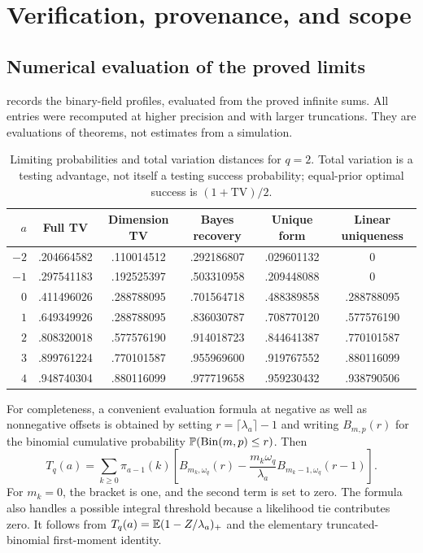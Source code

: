 \section{Verification, provenance, and scope}
\label{sec:provenance}

\subsection{Numerical evaluation of the proved limits}

 records the binary-field profiles, evaluated from the
proved infinite sums. All entries were recomputed at higher precision and
with larger truncations. They are evaluations of theorems, not estimates
from a simulation.

\begin{table}[htbp]
\centering
\small
\setlength{\tabcolsep}{5pt}
\begin{tabular}{rccccc}
\toprule
$a$ & Full TV & Dimension TV & Bayes recovery & Unique form & Linear uniqueness\\
\midrule
$-2$ & .204664582 & .110014512 & .292186807 & .029601132 & 0\\
$-1$ & .297541183 & .192525397 & .503310958 & .209448088 & 0\\
$0$  & .411496026 & .288788095 & .701564718 & .488389858 & .288788095\\
$1$  & .649349926 & .288788095 & .836030787 & .708770120 & .577576190\\
$2$  & .808320018 & .577576190 & .914018723 & .844641387 & .770101587\\
$3$  & .899761224 & .770101587 & .955969600 & .919767552 & .880116099\\
$4$  & .948740304 & .880116099 & .977719658 & .959230432 & .938790506\\
\bottomrule
\end{tabular}
\caption{Limiting probabilities and total variation distances for $q=2$.
Total variation is a testing advantage, not itself a testing success
probability; equal-prior optimal success is $(1+\mathrm{TV})/2$.}
\label{tab:binary}
\end{table}

For completeness, a convenient evaluation formula at negative as well as
nonnegative offsets is obtained by setting
$r=\lceil\lambda_a\rceil-1$ and writing $B_{m,p}(r)$ for the binomial
cumulative probability $\mathbb P(\operatorname{Bin}(m,p)\le r)$. Then
\begin{equation}
 T_q(a)=\sum_{k\ge0}\pi_{a-1}(k)
 \left[B_{m_k,\omega_q}(r)
 -\frac{m_k\omega_q}{\lambda_a}B_{m_k-1,\omega_q}(r-1)\right].
 \label{eq:cdf-evaluation}
\end{equation}
For $m_k=0$, the bracket is one, and the second term is set to zero.
The formula also handles a possible integral threshold because a likelihood
tie contributes zero. It follows from
$T_q(a)=\mathbb E(1-Z/\lambda_a)_+$ and the elementary truncated-binomial
first-moment identity.

